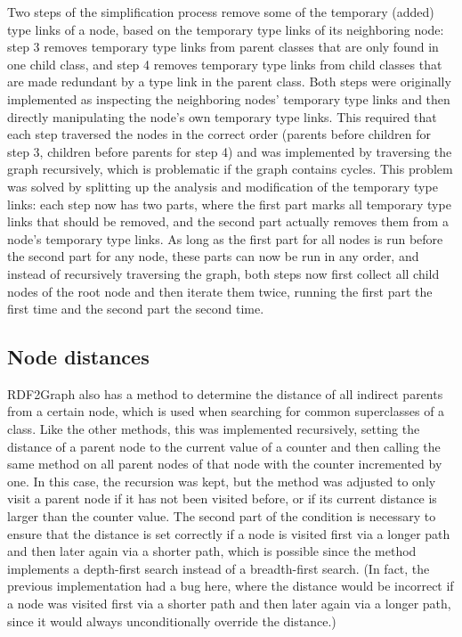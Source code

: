 Two steps of the simplification process
remove some of the temporary (added) type links of a node,
based on the temporary type links of its neighboring node:
step 3 removes temporary type links from parent classes that are only found in one child class,
and step 4 removes temporary type links from child classes that are made redundant by a type link in the parent class.
Both steps were originally implemented as inspecting the neighboring nodes’ temporary type links
and then directly manipulating the node’s own temporary type links.
This required that each step traversed the nodes in the correct order
(parents before children for step 3,
children before parents for step 4)
and was implemented by traversing the graph recursively,
which is problematic if the graph contains cycles.
This problem was solved by splitting up the analysis and modification of the temporary type links:
each step now has two parts,
where the first part marks all temporary type links that should be removed,
and the second part actually removes them from a node’s temporary type links.
As long as the first part for all nodes is run before the second part for any node,
these parts can now be run in any order,
and instead of recursively traversing the graph,
both steps now first collect all child nodes of the root node
and then iterate them twice,
running the first part the first time and the second part the second time.

\subsection{Node distances}
\label{subsec:RDF2Graph+Wikidata:cyclic-graph:distance}

RDF2Graph also has a method to determine the distance of all indirect parents from a certain node,
which is used when searching for common superclasses of a class.
Like the other methods, this was implemented recursively,
setting the distance of a parent node to the current value of a counter
and then calling the same method on all parent nodes of that node with the counter incremented by one.
In this case, the recursion was kept,
but the method was adjusted to only visit a parent node
if it has not been visited before, or if its current distance is larger than the counter value.
The second part of the condition is necessary to ensure that the distance is set correctly
if a node is visited first via a longer path and then later again via a shorter path,
which is possible since the method implements a depth-first search instead of a breadth-first search.
(In fact, the previous implementation had a bug here,
where the distance would be incorrect if a node was visited first via a shorter path and then later again via a longer path,
since it would always unconditionally override the distance.)

